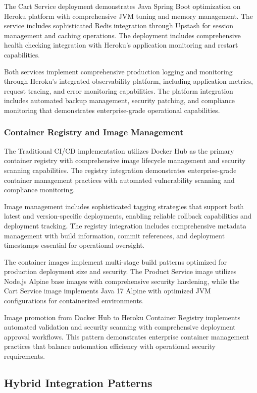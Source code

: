 The Cart Service deployment demonstrates Java Spring Boot optimization on Heroku platform with comprehensive JVM tuning and memory management. The service includes sophisticated Redis integration through Upstash for session management and caching operations. The deployment includes comprehensive health checking integration with Heroku's application monitoring and restart capabilities.

Both services implement comprehensive production logging and monitoring through Heroku's integrated observability platform, including application metrics, request tracing, and error monitoring capabilities. The platform integration includes automated backup management, security patching, and compliance monitoring that demonstrates enterprise-grade operational capabilities.

\subsubsection{Container Registry and Image Management}

The Traditional CI/CD implementation utilizes Docker Hub as the primary container registry with comprehensive image lifecycle management and security scanning capabilities. The registry integration demonstrates enterprise-grade container management practices with automated vulnerability scanning and compliance monitoring.

Image management includes sophisticated tagging strategies that support both latest and version-specific deployments, enabling reliable rollback capabilities and deployment tracking. The registry integration includes comprehensive metadata management with build information, commit references, and deployment timestamps essential for operational oversight.

The container images implement multi-stage build patterns optimized for production deployment size and security. The Product Service image utilizes Node.js Alpine base images with comprehensive security hardening, while the Cart Service image implements Java 17 Alpine with optimized JVM configurations for containerized environments.

Image promotion from Docker Hub to Heroku Container Registry implements automated validation and security scanning with comprehensive deployment approval workflows. This pattern demonstrates enterprise container management practices that balance automation efficiency with operational security requirements.

\subsection{Hybrid Integration Patterns}

